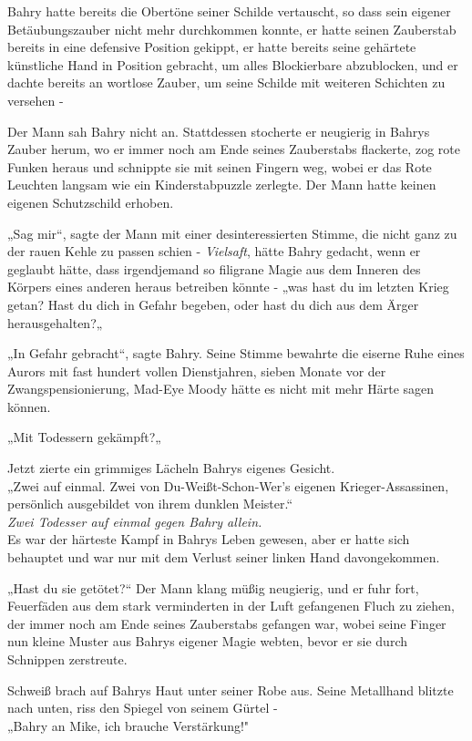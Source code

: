 {Bahry hatte bereits die Obertöne seiner Schilde vertauscht, so dass sein eigener Betäubungszauber nicht mehr durchkommen konnte, er hatte seinen Zauberstab bereits in eine defensive Position gekippt, er hatte bereits seine gehärtete künstliche Hand in Position gebracht, um alles Blockierbare abzublocken, und er dachte bereits an wortlose Zauber, um seine Schilde mit weiteren Schichten zu versehen -

Der Mann sah Bahry nicht an. Stattdessen stocherte er neugierig in Bahrys Zauber herum, wo er immer noch am Ende seines Zauberstabs flackerte, zog rote Funken heraus und schnippte sie mit seinen Fingern weg, wobei er das Rote Leuchten langsam wie ein Kinderstabpuzzle zerlegte. Der Mann hatte keinen eigenen Schutzschild erhoben.

„Sag mir“, sagte der Mann mit einer desinteressierten Stimme, die nicht ganz zu der rauen Kehle zu passen schien - \emph{Vielsaft}, hätte Bahry gedacht, wenn er geglaubt hätte, dass irgendjemand so filigrane Magie aus dem Inneren des Körpers eines anderen heraus betreiben könnte - „was hast du im letzten Krieg getan? Hast du dich in Gefahr begeben, oder hast du dich aus dem Ärger herausgehalten?„

„In Gefahr gebracht“, sagte Bahry. Seine Stimme bewahrte die eiserne Ruhe eines Aurors mit fast hundert vollen Dienstjahren, sieben Monate vor der Zwangspensionierung, Mad-Eye Moody hätte es nicht mit mehr Härte sagen können.

„Mit Todessern gekämpft?„

Jetzt zierte ein grimmiges Lächeln Bahrys eigenes Gesicht.\\ „Zwei auf einmal. Zwei von Du-Weißt-Schon-Wer's eigenen Krieger-Assassinen, persönlich ausgebildet von ihrem dunklen Meister.“\\ \emph{Zwei Todesser auf einmal gegen Bahry allein.}\\ Es war der härteste Kampf in Bahrys Leben gewesen, aber er hatte sich behauptet und war nur mit dem Verlust seiner linken Hand davongekommen.

„Hast du sie getötet?“ Der Mann klang müßig neugierig, und er fuhr fort, Feuerfäden aus dem stark verminderten in der Luft gefangenen Fluch zu ziehen, der immer noch am Ende seines Zauberstabs gefangen war, wobei seine Finger nun kleine Muster aus Bahrys eigener Magie webten, bevor er sie durch Schnippen zerstreute.

Schweiß brach auf Bahrys Haut unter seiner Robe aus. Seine Metallhand blitzte nach unten, riss den Spiegel von seinem Gürtel -\\ „Bahry an Mike, ich brauche Verstärkung!"

}
